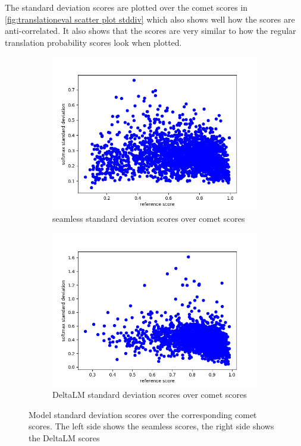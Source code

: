 The standard deviation scores are plotted over the comet scores in \autoref{fig:translationeval scatter plot stddiv} which also shows well how the scores are anti-correlated. It also shows that the scores are very similar to how the regular translation probability scores look when plotted. 
    \begin{figure}
            \centering%
    \begin{subfigure}{0.4\linewidth}
        \includegraphics[width=\textwidth]{Latex/sections/images/seamlessstddiv.png}
        \caption{seamless standard deviation scores over comet scores}
    \end{subfigure}
    \begin{subfigure}{0.4\linewidth}
        \includegraphics[width=\textwidth]{Latex/sections/images/dlmstddiv.png}
        \caption{DeltaLM standard deviation scores over comet scores}
    \end{subfigure}
    \caption{Model standard deviation scores over the corresponding comet scores. The left side shows the seamless scores, the right side shows the DeltaLM scores}
    \label{fig:translationeval scatter plot stddiv}
\end{figure}

